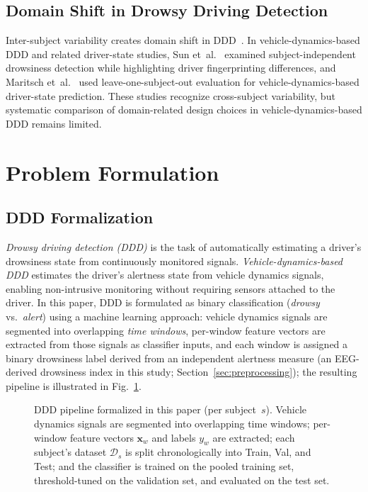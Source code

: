 \documentclass[lettersize,journal]{IEEEtran}
\begin{document}
\subsection{Domain Shift in Drowsy Driving Detection}
Inter-subject variability creates domain shift in DDD~\cite{pan2010,aravinth2025}.
In vehicle-dynamics-based DDD and related driver-state studies, Sun et~al.~\cite{sun2021} examined subject-independent drowsiness detection while highlighting driver fingerprinting differences, and Maritsch et~al.~\cite{maritsch2022} used leave-one-subject-out evaluation for vehicle-dynamics-based driver-state prediction.
These studies recognize cross-subject variability, but systematic comparison of domain-related design choices in vehicle-dynamics-based DDD remains limited.

\section{Problem Formulation}
\label{sec:formulation}

\subsection{DDD Formalization}\label{sec:ddd_overview}
\emph{Drowsy driving detection (DDD)} is the task of automatically estimating a driver's drowsiness state from continuously monitored signals.
\emph{Vehicle-dynamics-based DDD} estimates the driver's alertness state from vehicle dynamics signals, enabling non-intrusive monitoring without requiring sensors attached to the driver.
In this paper, DDD is formulated as binary classification (\emph{drowsy} vs.\ \emph{alert}) using a machine learning approach: vehicle dynamics signals are segmented into overlapping \emph{time windows}, per-window feature vectors are extracted from those signals as classifier inputs, and each window is assigned a binary drowsiness label derived from an independent alertness measure (an EEG-derived drowsiness index in this study; Section~\ref{sec:preprocessing}); the resulting pipeline is illustrated in Fig.~\ref{fig:framework_ddd_flow}.

\begin{figure}[!t]
\centering
\resizebox{\columnwidth}{!}{}
\caption{DDD pipeline formalized in this paper (per subject~$s$). Vehicle dynamics signals are segmented into overlapping time windows; per-window feature vectors $\mathbf{x}_w$ and labels $y_w$ are extracted; each subject's dataset $\mathcal{D}_s$ is split chronologically into Train, Val, and Test; and the classifier is trained on the pooled training set, threshold-tuned on the validation set, and evaluated on the test set.}
\label{fig:framework_ddd_flow}
\end{figure}
\end{document}
